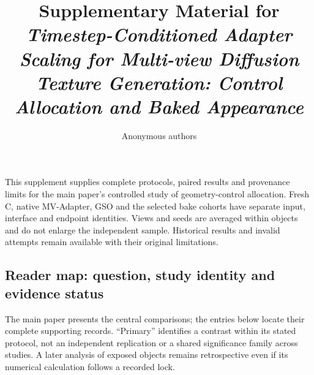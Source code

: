 \documentclass[11pt]{article}
\title{Supplementary Material for\\
\emph{Timestep-Conditioned Adapter Scaling for Multi-view Diffusion Texture Generation: Control Allocation and Baked Appearance}}
\author{Anonymous authors}
\date{}
\begin{document}
\maketitle
\noindent This supplement supplies complete protocols, paired results and provenance limits for the main paper's controlled study of geometry-control allocation. Fresh C, native MV-Adapter, GSO and the selected bake cohorts have separate input, interface and endpoint identities. Views and seeds are averaged within objects and do not enlarge the independent sample. Historical results and invalid attempts remain available with their original limitations.

\subsection*{Reader map: question, study identity and evidence status}
The main paper presents the central comparisons; the entries below locate their complete supporting records. ``Primary'' identifies a contrast within its stated protocol, not an independent replication or a shared significance family across studies. A later analysis of exposed objects remains retrospective even if its numerical calculation follows a recorded lock.
\end{document}
